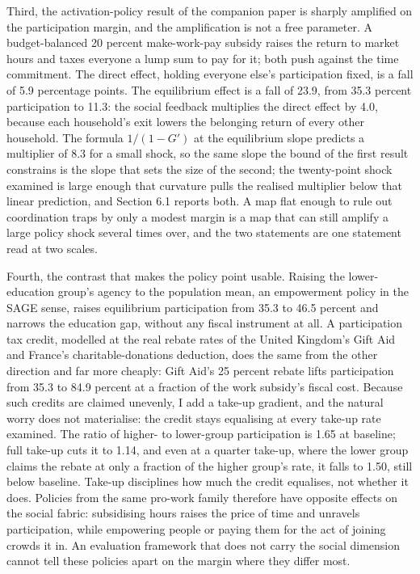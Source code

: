 \documentclass[11pt]{article}
\begin{document}
Third, the activation-policy result of the companion paper is sharply amplified on the participation margin, and the amplification is not a free parameter. A budget-balanced 20 percent make-work-pay subsidy raises the return to market hours and taxes everyone a lump sum to pay for it; both push against the time commitment. The direct effect, holding everyone else's participation fixed, is a fall of 5.9 percentage points. The equilibrium effect is a fall of 23.9, from 35.3 percent participation to 11.3: the social feedback multiplies the direct effect by 4.0, because each household's exit lowers the belonging return of every other household. The formula $1/(1-G')$ at the equilibrium slope predicts a multiplier of 8.3 for a small shock, so the same slope the bound of the first result constrains is the slope that sets the size of the second; the twenty-point shock examined is large enough that curvature pulls the realised multiplier below that linear prediction, and Section 6.1 reports both. A map flat enough to rule out coordination traps by only a modest margin is a map that can still amplify a large policy shock several times over, and the two statements are one statement read at two scales.

Fourth, the contrast that makes the policy point usable. Raising the lower-education group's agency to the population mean, an empowerment policy in the SAGE sense, raises equilibrium participation from 35.3 to 46.5 percent and narrows the education gap, without any fiscal instrument at all. A participation tax credit, modelled at the real rebate rates of the United Kingdom's Gift Aid and France's charitable-donations deduction, does the same from the other direction and far more cheaply: Gift Aid's 25 percent rebate lifts participation from 35.3 to 84.9 percent at a fraction of the work subsidy's fiscal cost. Because such credits are claimed unevenly, I add a take-up gradient, and the natural worry does not materialise: the credit stays equalising at every take-up rate examined. The ratio of higher- to lower-group participation is 1.65 at baseline; full take-up cuts it to 1.14, and even at a quarter take-up, where the lower group claims the rebate at only a fraction of the higher group's rate, it falls to 1.50, still below baseline. Take-up disciplines how much the credit equalises, not whether it does. Policies from the same pro-work family therefore have opposite effects on the social fabric: subsidising hours raises the price of time and unravels participation, while empowering people or paying them for the act of joining crowds it in. An evaluation framework that does not carry the social dimension cannot tell these policies apart on the margin where they differ most.
\end{document}
